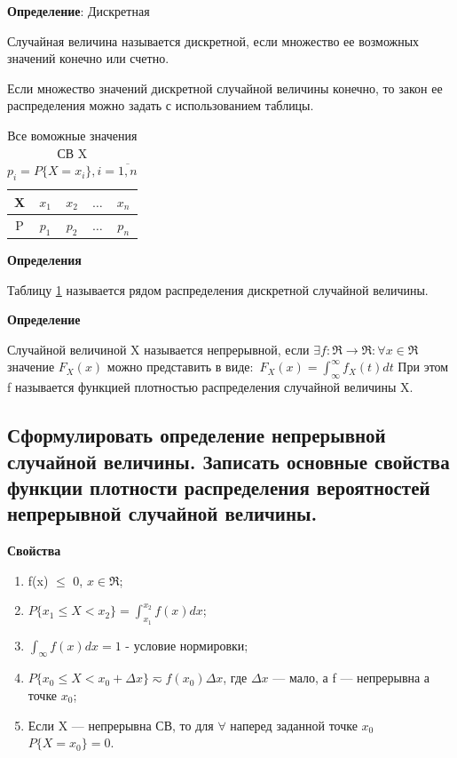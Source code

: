 \textbf{Определение}: Дискретная

Случайная величина называется дискретной, если множество ее возможных значений конечно или счетно.

Если множество значений дискретной случайной величины конечно, то закон ее распределения можно задать с использованием таблицы.
\begin{table}[ht!]
	\begin{center}
		\caption{Все воможные значения СВ X $p_i = P\{X=x_i\}, i = \overline{1,n}$}
		\label{tbl:best}
		\begin{tabular}{|c|c|c|c|c|}
			\hline
			X & $x_1$ & $x_2$ & $\dots$ & $x_n$ \\ 
			\hline
			P & $p_1$ & $p_2$ & $\dots$ & $p_n$ \\
			\hline
		\end{tabular}
	\end{center}
\end{table}

\textbf{Определения}

Таблицу \ref{tbl:best} называется рядом распределения дискретной случайной величины.

\textbf{Определение}

Случайной величиной X называется непрерывной, если $\exists f: \Re \rightarrow \Re: \forall x \in \Re$ значение $F_X(x)$ можно представить в виде:\
$F_X(x) = \int_{\infty}^{\infty} f_X(t)dt$ При этом f называется функцией плотностью распределения случайной величины X.

\subsection{Сформулировать определение непрерывной случайной величины. Записать основные свойства функции плотности распределения вероятностей непрерывной случайной величины.}

\textbf{Свойства}

\begin{enumerate}[label=\arabic*.]
	\item f(x) $\leq$ 0, $x \in \Re$;
	\item $P\{x_1 \leq X < x_2\} = \int_{x_1}^{x_2}f(x)dx$;
	\item $\int_{\infty}f(x)dx = 1$ - условие нормировки;
	\item $P\{x_0 \leq X < x_0 + \Delta x\} \eqsim f(x_0)\Delta x$, где $\Delta x$ --- мало, а f --- непрерывна а точке $x_0$;
	\item Если X --- непрерывна СВ, то для $\forall$ наперед заданной точке $x_0$ $P\{X=x_0\}=0$.
\end{enumerate}


